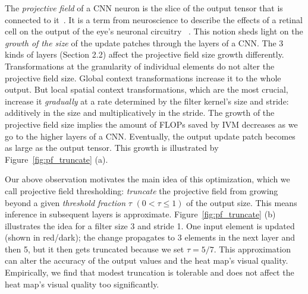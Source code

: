 The \textit{projective field} of a CNN neuron is the slice of the output tensor that is connected to it~\cite{le2017receptive, basiccnnoperations}. It is a term from neuroscience to describe the effects of a retinal cell on the output of the eye's neuronal circuitry~ \cite{de2011projective}. This notion sheds light on the \textit{growth of the size} of the update patches through the layers of a CNN. The 3 kinds of layers (Section 2.2) affect the projective field size growth differently. Transformations at the granularity of individual elements do not alter the projective field size. Global context transformations increase it to the whole output. But local spatial context transformations, which are the most crucial, increase it \textit{gradually} at a rate determined by the filter kernel's size and stride: additively in the size and multiplicatively in the stride. The growth of the projective field size implies the amount of FLOPs saved by IVM decreases as we go to the higher layers of a CNN. Eventually, the output update patch becomes as large as the output tensor. This growth is illustrated by Figure~\ref{fig:pf_truncate} (a).


Our above observation motivates the main idea of this optimization, which we call projective field thresholding: \textit{truncate} the projective field from growing beyond a given \textit{threshold fraction} $\tau$ $(0 < \tau \leq 1)$ of the output size. This means inference in subsequent layers is approximate. Figure~\ref{fig:pf_truncate} (b) illustrates the idea for a filter size 3 and stride 1. One input element is updated (shown in red/dark); the change propagates to 3 elements in the next layer and then 5, but it then gets truncated because we set $\tau = 5/7$. This approximation can alter the accuracy of the output values and the heat map's visual quality. Empirically, we find that modest truncation is tolerable and does not affect the heat map's visual quality too significantly. 

